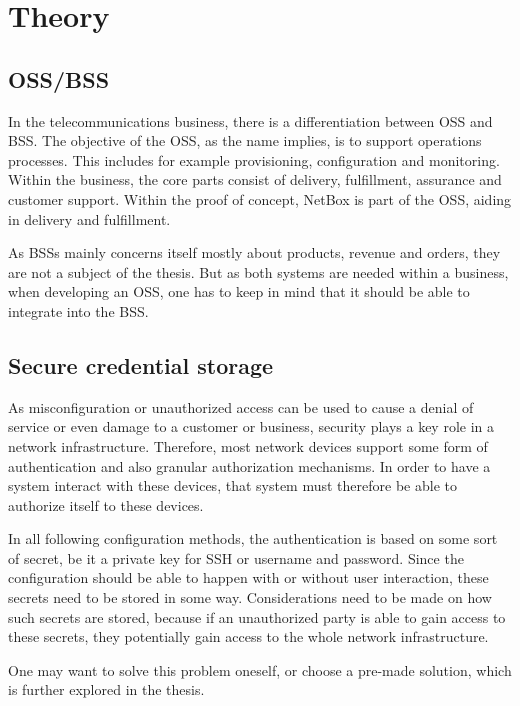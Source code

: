 \chapter{\label{theory}Theory}
\thispagestyle{fancy}


\section{OSS/BSS}

In the telecommunications business, there is a differentiation between \acrlong{OSS} and \acrlong{BSS}.
The objective of the \acrshort{OSS}, as the name implies, is to support operations processes.
This includes for example provisioning, configuration and monitoring. Within the business,
the core parts consist of delivery, fulfillment, assurance and customer support.
Within the proof of concept, NetBox is part of the OSS, aiding in delivery and fulfillment.

As \acrshort{BSS}s mainly concerns itself mostly about products, revenue and orders,
they are not a subject of the thesis. But as both systems are needed within a business,
when developing an \acrshort{OSS}, one has to keep in mind that it should be able to
integrate into the \acrshort{BSS}.

\section{Secure credential storage}

As misconfiguration or unauthorized access can be used to cause a denial of service or
even damage to a customer or business, security plays a key role in a network infrastructure.
Therefore, most network devices support some form of authentication and also granular authorization
mechanisms. In order to have a system interact with these devices, that system must therefore
be able to authorize itself to these devices.

In all following configuration methods, the authentication is based on some sort of secret,
be it a private key for SSH or username and password. Since the configuration should be
able to happen with or without user interaction, these secrets need to be stored in some way.
Considerations need to be made on how such secrets are stored, because if an unauthorized party
is able to gain access to these secrets, they potentially gain access to the whole network infrastructure.

One may want to solve this problem oneself, or choose a pre-made solution, which is further explored
in the thesis.


